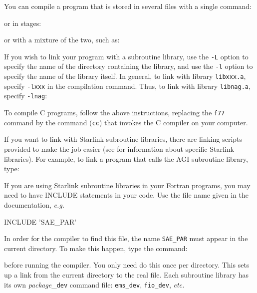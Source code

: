 \documentclass[twoside,11pt,nolof]{starlink}
\begin{document}
You can compile a program that is stored in several files with a single command:
\begin{terminalv}
\end{terminalv}
or in stages:
\begin{terminalv}
\end{terminalv}
or with a mixture of the two, such as:
\begin{terminalv}
\end{terminalv}
If you wish to link your program with a subroutine library, use the \texttt{-L}
option to specify the name of the directory containing the library, and use the
\texttt{-l} option to specify the name of the library itself.
In general, to link with library \texttt{libxxx.a}, specify \texttt{-lxxx} in the
compilation command.
Thus, to link with library \texttt{libnag.a}, specify \texttt{-lnag}:
\begin{terminalv}
\end{terminalv}
To compile C programs, follow the above instructions, replacing the \texttt{f77}
command by the command (\texttt{cc}) that invokes the C compiler on your computer.

If you want to link with Starlink subroutine libraries, there are linking
scripts provided to make the job easier (see
 for information about
specific Starlink libraries).
For example, to link a program that calls the AGI
subroutine library, type:
\begin{terminalv}
\end{terminalv}
If you are using Starlink subroutine libraries in your Fortran programs, you
may need to have INCLUDE statements in your code.
Use the file name given in the documentation, \emph{e.g.}
\begin{terminalv}
INCLUDE 'SAE_PAR'
\end{terminalv}
In order for the compiler to find this file, the name \texttt{SAE\_PAR}
must appear in the current directory.
To make this happen, type the command:
\begin{terminalv}
\end{terminalv}
before running the compiler.
You only need do this once per directory.
This sets up a link from the current directory to the real file.
Each subroutine library has its own \emph{package}\_\texttt{dev} command file:
\texttt{ems\_dev}, \texttt{fio\_dev}, \emph{etc.}
\end{document}
